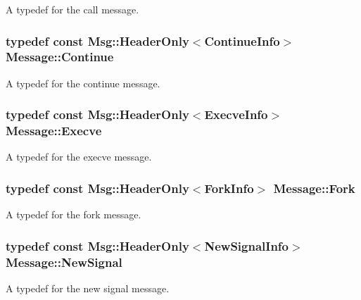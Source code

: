 A typedef for the call message. 

\hypertarget{class_message_a40b27db67cec30a7b6f4dbdf76e5add2}{
\subsubsection[{Continue}]{\setlength{\rightskip}{0pt plus 5cm}typedef const {\bf Msg\-::\-Header\-Only}$<${\bf Continue\-Info}$>$ {\bf Message\-::\-Continue}}}\label{class_message_a40b27db67cec30a7b6f4dbdf76e5add2}


A typedef for the continue message. 

\hypertarget{class_message_a0cb7454c0388a6df9b83b205b58028cf}{
\subsubsection[{Execve}]{\setlength{\rightskip}{0pt plus 5cm}typedef const {\bf Msg\-::\-Header\-Only}$<${\bf Execve\-Info}$>$ {\bf Message\-::\-Execve}}}\label{class_message_a0cb7454c0388a6df9b83b205b58028cf}


A typedef for the execve message. 

\hypertarget{class_message_ab60a0847afbe9dcef7cf5cd87d52ca4a}{
\subsubsection[{Fork}]{\setlength{\rightskip}{0pt plus 5cm}typedef const {\bf Msg\-::\-Header\-Only}$<${\bf Fork\-Info}$>$ {\bf Message\-::\-Fork}}}\label{class_message_ab60a0847afbe9dcef7cf5cd87d52ca4a}


A typedef for the fork message. 

\hypertarget{class_message_ae40f0243fd15231d8f44931e4adf7d3e}{
\subsubsection[{New\-Signal}]{\setlength{\rightskip}{0pt plus 5cm}typedef const {\bf Msg\-::\-Header\-Only}$<${\bf New\-Signal\-Info}$>$ {\bf Message\-::\-New\-Signal}}}\label{class_message_ae40f0243fd15231d8f44931e4adf7d3e}


A typedef for the new signal message. 

